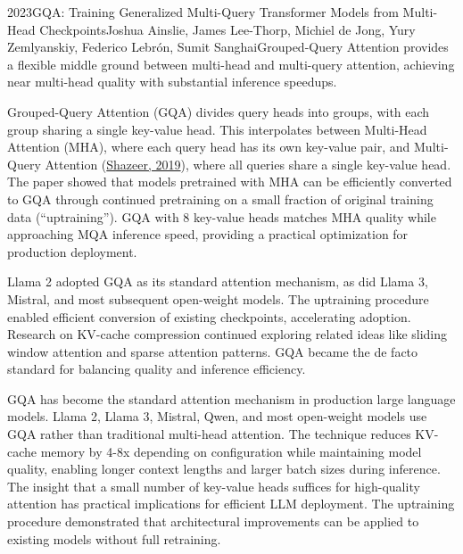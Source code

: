 
\begin{papersummary}{2023}{GQA: Training Generalized Multi-Query Transformer Models from Multi-Head Checkpoints}{Joshua Ainslie, James Lee-Thorp, Michiel de Jong, Yury Zemlyanskiy, Federico Lebr\'on, Sumit Sanghai}{Grouped-Query Attention provides a flexible middle ground between multi-head and multi-query attention, achieving near multi-head quality with substantial inference speedups.}

Grouped-Query Attention (GQA) divides query heads into groups, with each group sharing a single key-value head. This interpolates between Multi-Head Attention (MHA), where each query head has its own key-value pair, and Multi-Query Attention (\hyperref[paper:shazeer-2019-mqa]{Shazeer, 2019}), where all queries share a single key-value head. The paper showed that models pretrained with MHA can be efficiently converted to GQA through continued pretraining on a small fraction of original training data (``uptraining''). GQA with 8 key-value heads matches MHA quality while approaching MQA inference speed, providing a practical optimization for production deployment.

Llama 2 adopted GQA as its standard attention mechanism, as did Llama 3, Mistral, and most subsequent open-weight models. The uptraining procedure enabled efficient conversion of existing checkpoints, accelerating adoption. Research on KV-cache compression continued exploring related ideas like sliding window attention and sparse attention patterns. GQA became the de facto standard for balancing quality and inference efficiency.

GQA has become the standard attention mechanism in production large language models. Llama 2, Llama 3, Mistral, Qwen, and most open-weight models use GQA rather than traditional multi-head attention. The technique reduces KV-cache memory by 4-8x depending on configuration while maintaining model quality, enabling longer context lengths and larger batch sizes during inference. The insight that a small number of key-value heads suffices for high-quality attention has practical implications for efficient LLM deployment. The uptraining procedure demonstrated that architectural improvements can be applied to existing models without full retraining.

\end{papersummary}
